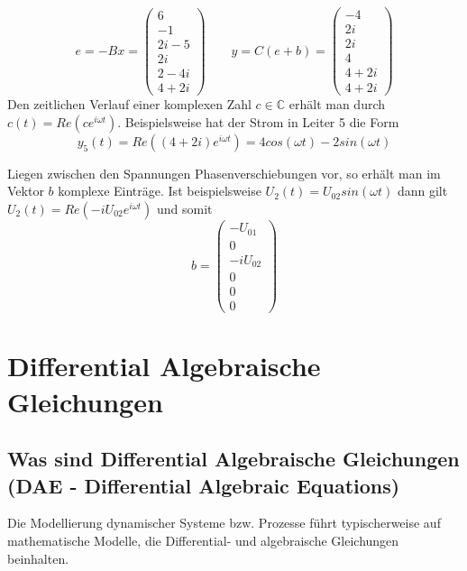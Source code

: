 \documentclass[11pt,titlepage]{article}
\begin{document}
		\begin{displaymath}
			e = -Bx = 
			\begin{pmatrix}
				6 \\
				-1 \\
				2i-5 \\
				2i \\
				2-4i \\
				4+2i
			\end{pmatrix}
			\qquad
			y = C(e+b) = 
			\begin{pmatrix}
				-4 \\
				2i \\
				2i \\
				4 \\
				4+2i \\
				4+2i
			\end{pmatrix}
		\end{displaymath}
		Den zeitlichen Verlauf einer komplexen Zahl $c \in \mathbb{C}$ erhält man durch $c(t) = Re(ce^{i \omega t})$. Beispielsweise hat der Strom in Leiter 5 die Form
		\begin{displaymath}
			y_5 (t) = Re((4+2i)e^{i \omega t}) = 4 cos(\omega t) - 2 sin(\omega t)
		\end{displaymath}
	
		Liegen zwischen den Spannungen Phasenverschiebungen vor, so erhält man im Vektor $b$ komplexe Einträge. Ist beispielsweise $U_2 (t) = U_{02} sin(\omega t)$ dann gilt $U_2 (t) = Re(-iU_{02}e^{i \omega t})$ und somit
		\begin{displaymath}
			b=
			\begin{pmatrix}
				-U_{01} \\
				0 \\
				-iU_{02}\\
				0 \\
				0 \\
				0
			\end{pmatrix}
		\end{displaymath}
	\newpage
	\section{Differential Algebraische Gleichungen}
		\subsection{Was sind Differential Algebraische Gleichungen (DAE - Differential Algebraic Equations)}
		Die Modellierung dynamischer Systeme bzw. Prozesse führt typischerweise auf mathematische Modelle, die Differential- und algebraische Gleichungen beinhalten.
		
\end{document}
